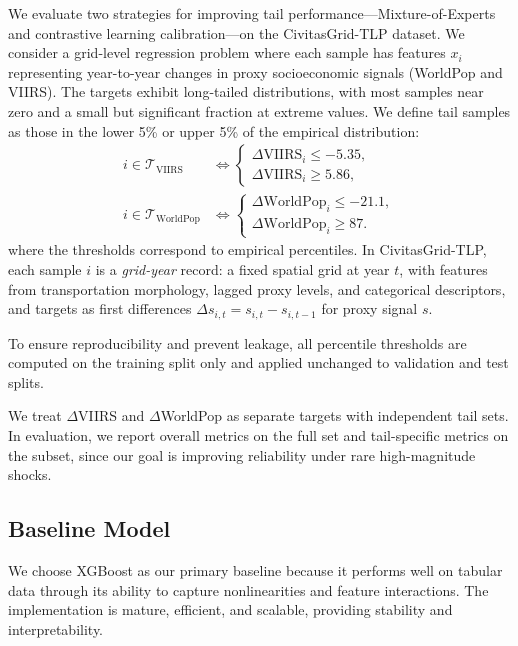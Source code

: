 \documentclass[11pt,conference,onecolumn]{IEEEtran}
\begin{document}
We evaluate two strategies for improving tail performance—Mixture-of-Experts and contrastive learning calibration—on the CivitasGrid-TLP dataset. We consider a grid-level regression problem where each sample has features $x_i$ representing year-to-year changes in proxy socioeconomic signals (WorldPop and VIIRS). The targets exhibit long-tailed distributions, with most samples near zero and a small but significant fraction at extreme values. We define tail samples as those in the lower 5\% or upper 5\% of the empirical distribution:
\begin{equation}
\begin{aligned}
i\in\mathcal{T}_{\mathrm{VIIRS}} &\iff
\begin{cases}
\Delta \mathrm{VIIRS}_i \le -5.35,\\
\Delta \mathrm{VIIRS}_i \ge 5.86,
\end{cases}\\
i\in\mathcal{T}_{\mathrm{WorldPop}} &\iff
\begin{cases}
\Delta \mathrm{WorldPop}_i \le -21.1,\\
\Delta \mathrm{WorldPop}_i \ge 87.
\end{cases}
\end{aligned}
\end{equation}
where the thresholds correspond to empirical percentiles. In CivitasGrid-TLP, each sample $i$ is a \emph{grid-year} record: a fixed spatial grid at year $t$, with features from transportation morphology, lagged proxy levels, and categorical descriptors, and targets as first differences $\Delta s_{i,t} = s_{i,t}-s_{i,t-1}$ for proxy signal $s$.

To ensure reproducibility and prevent leakage, all percentile thresholds are computed on the training split only and applied unchanged to validation and test splits.

We treat $\Delta$VIIRS and $\Delta$WorldPop as separate targets with independent tail sets. In evaluation, we report overall metrics on the full set and tail-specific metrics on the subset, since our goal is improving reliability under rare high-magnitude shocks.

\subsection{Baseline Model}

We choose XGBoost as our primary baseline because it performs well on tabular data through its ability to capture nonlinearities and feature interactions. The implementation is mature, efficient, and scalable, providing stability and interpretability.
\end{document}
